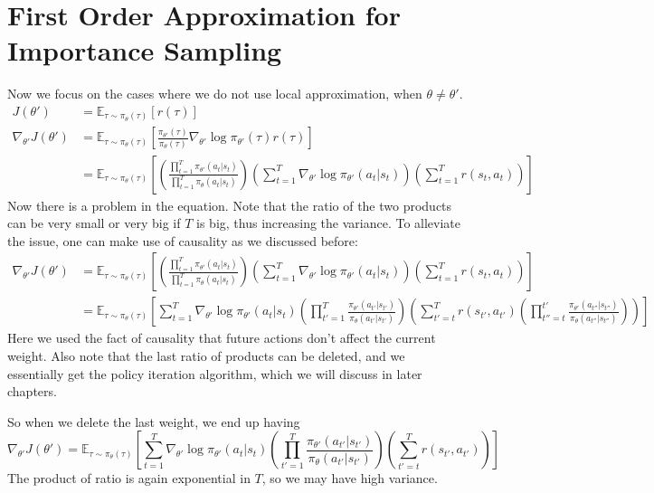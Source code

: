 \section{First Order Approximation for Importance Sampling}
Now we focus on the cases where we do not use local approximation, when $\theta \neq \theta'$.
\begin{align*}
    J(\theta') &= \mathbb{E}_{\tau\sim\pi_\theta(\tau)}\left[r(\tau)\right]\\
    \nabla_{\theta'}J(\theta')&=\mathbb{E}_{\tau\sim\pi_\theta(\tau)}\left[\frac{\pi_{\theta'}(\tau)}{\pi_\theta(\tau)}\nabla_{\theta'}\log\pi_{\theta'}(\tau)r(\tau)\right]\\
    &= \mathbb{E}_{\tau\sim\pi_\theta(\tau)}\left[  \left(  \frac{\prod_{t=1}^T\pi_{\theta'}(a_t|s_t)}{\prod_{t=1}^T\pi_{\theta}(a_t|s_t)} \right)\left( \sum_{t=1}^T\nabla_{\theta'}\log\pi_{\theta'}(a_t|s_t)  \right)\left(\sum_{t=1}^Tr(s_t,a_t)\right)  \right]
\end{align*}
Now there is a problem in the equation. Note that the ratio of the two products can be very small or very big if $T$ is big, thus increasing the variance. To alleviate the issue, one can make use of causality as we discussed before:
\begin{align*}
    \nabla_{\theta'}J(\theta')&= \mathbb{E}_{\tau\sim\pi_\theta(\tau)}\left[  \left(  \frac{\prod_{t=1}^T\pi_{\theta'}(a_t|s_t)}{\prod_{t=1}^T\pi_{\theta}(a_t|s_t)} \right)\left( \sum_{t=1}^T\nabla_{\theta'}\log\pi_{\theta'}(a_t|s_t)  \right)\left(\sum_{t=1}^Tr(s_t,a_t)\right)  \right]\\
    &=\mathbb{E}_{\tau\sim\pi_\theta(\tau)}\left[  \sum_{t=1}^T\nabla_{\theta'}\log\pi_{\theta'}(a_t|s_t) \left(\prod_{t'=1}^T \frac{\pi_{\theta'}(a_{t'}|s_{t'}) }{\pi_{\theta}(a_{t'}|s_{t'})}\right)    \left(  \sum_{t'=t}^Tr(s_{t'},a_{t'})\left(  \prod_{t'' = t}^{t'}\frac{\pi_{\theta'}(a_{t''}|s_{t''}) }{\pi_{\theta}(a_{t''}|s_{t''})} \right)    \right)\right]
\end{align*}
Here we used the fact of causality that future actions don't affect the current weight. Also note that the last ratio of products can be deleted, and we essentially get the policy iteration algorithm, which we will discuss in later chapters. 

So when we delete the last weight, we end up having
$$\nabla_{\theta'}J(\theta')= \mathbb{E}_{\tau\sim\pi_\theta(\tau)}\left[   \sum_{t=1}^T\nabla_{\theta'}\log\pi_{\theta'}(a_t|s_t)    \left(\prod_{t'=1}^T \frac{\pi_{\theta'}(a_{t'}|s_{t'}) }{\pi_{\theta}(a_{t'}|s_{t'})}\right)\left(  \sum_{t'=t}^Tr(s_{t'},a_{t'})\right)\right]$$
The product of ratio is again exponential in $T$, so we may have high variance. 

